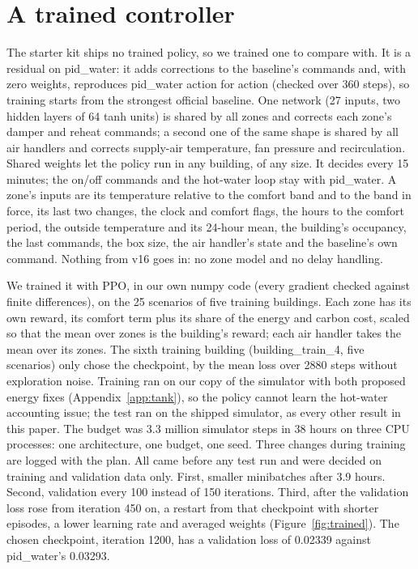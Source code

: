 \section{A trained controller}\label{app:trained}
The starter kit ships no trained policy, so we trained one to compare with. It is a residual on pid\_water: it adds
corrections to the baseline's commands and, with zero weights, reproduces pid\_water action for action (checked over
360 steps), so training starts from the strongest official baseline. One network (27 inputs, two hidden layers of 64
tanh units) is shared by all zones and corrects each zone's damper and reheat commands; a second one of the same shape
is shared by all air handlers and corrects supply-air temperature, fan pressure and recirculation. Shared weights let
the policy run in any building, of any size. It decides every 15 minutes; the on/off commands and the hot-water loop
stay with pid\_water. A zone's inputs are its temperature relative to the comfort band and to the band in force, its
last two changes, the clock and comfort flags, the hours to the comfort period, the outside temperature and its
24-hour mean, the building's occupancy, the last commands, the box size, the air handler's state and the baseline's
own command. Nothing from v16 goes in: no zone model and no delay handling.

We trained it with PPO, in our own numpy code (every gradient checked against finite differences), on the 25 scenarios
of five training buildings. Each zone has its own reward, its comfort term plus its share of the energy and carbon
cost, scaled so that the mean over zones is the building's reward; each air handler takes the mean over its zones. The
sixth training building (building\_train\_4, five scenarios) only chose the checkpoint, by the mean loss over 2880 steps
without exploration noise. Training ran on our copy of the simulator with both proposed energy fixes (Appendix~\ref{app:tank}),
so the policy cannot learn the hot-water accounting issue; the test ran on the shipped simulator, as every other result
in this paper. The budget was 3.3 million simulator steps in 38 hours on three CPU processes: one
architecture, one budget, one seed. Three changes during training are logged with the plan. All came before any test
run and were decided on training and validation data only. First, smaller minibatches after 3.9 hours. Second,
validation every 100 instead of 150 iterations. Third, after the validation loss rose from iteration 450 on, a restart
from that checkpoint with shorter episodes, a lower learning rate and averaged weights (Figure~\ref{fig:trained}). The
chosen checkpoint, iteration 1200, has a validation loss of 0.02339 against pid\_water's 0.03293.

